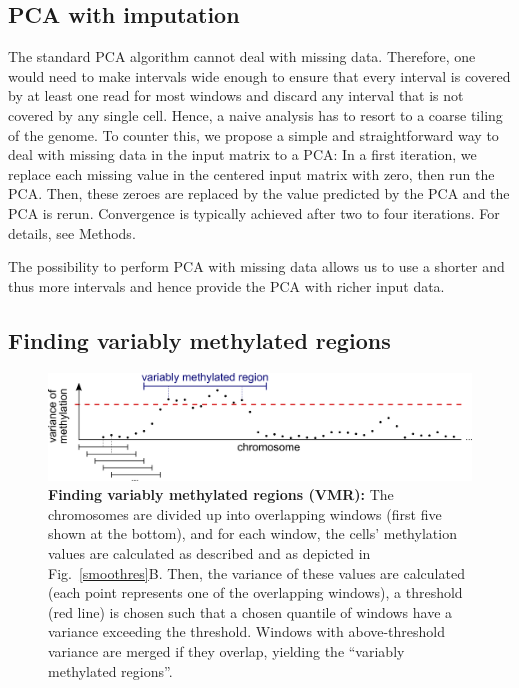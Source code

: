 \documentclass[twocolumn,10pt]{article}
\begin{document}
\subsection{PCA with imputation}

The standard PCA algorithm cannot deal with missing data. Therefore, one would need to make intervals wide enough to ensure that every interval is covered by at least one read for most windows and discard any interval that is not covered by any single cell. Hence, a naive analysis has to resort to a coarse tiling of the genome. To counter this, we propose a simple and straightforward way to deal with missing data in the input matrix to a PCA: In a first iteration, we replace each missing value in the centered input matrix with zero, then run the PCA. Then, these zeroes are replaced by the value predicted by the PCA and the PCA is rerun. Convergence is typically achieved after two to four iterations. For details, see Methods. 

The possibility to perform PCA with missing data allows us to use a shorter and thus more intervals and hence provide the PCA with richer input data.

\subsection{Finding variably methylated regions}

\begin{figure}
	\includegraphics[width=\columnwidth]{figures/Fig_sliding.png}
	\caption{\small \textbf{Finding variably methylated regions (VMR):} The chromosomes are divided up into overlapping windows (first five shown at the bottom), and for each window, the cells' methylation values are calculated as described and as depicted in Fig.\ \ref{smoothres}B. Then, the variance of these values are calculated (each point represents one of the overlapping windows), a threshold (red line) is chosen such that a chosen quantile of windows have a variance exceeding the threshold. Windows with above-threshold variance are merged if they overlap, yielding the ``variably methylated regions''.}
	\label{vmr}
\end{figure}
\end{document}
